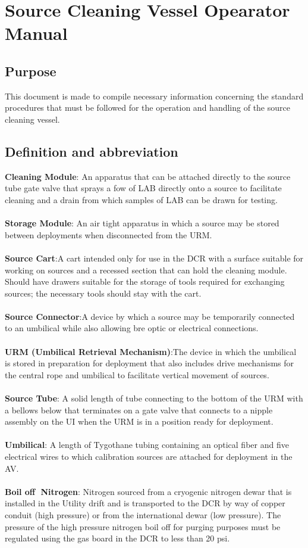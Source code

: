 \chapter{Source Cleaning Vessel Opearator Manual}
\section{Purpose}
This document is made to compile necessary information concerning the standard procedures that must be followed for the operation and handling of  the source cleaning vessel.
\section{Definition and abbreviation}
\textbf{Cleaning Module}: An apparatus that can be attached directly to the source tube gate valve that sprays a fow of LAB directly onto a source to facilitate cleaning and a drain from which samples of LAB can be drawn for testing.\\
\\
\textbf{Storage Module}: An air tight apparatus in which a source may be stored between deployments when disconnected from the URM.\\
\\
\textbf{Source Cart}:A cart intended only for use in the DCR with a surface suitable for working on sources and a recessed section that can hold the cleaning module. Should have drawers suitable for the storage of tools required for exchanging sources; the necessary tools should stay with the cart.\\
\\
\textbf{Source Connector}:A device by which a source may be temporarily connected to an umbilical while also allowing bre optic or electrical connections.\\
\\
\textbf{URM (Umbilical Retrieval Mechanism)}:The device in which the umbilical is stored
in preparation for deployment that also includes drive mechanisms for the central rope and umbilical to facilitate vertical movement of sources.\\
\\
\textbf{Source Tube}: A solid length of tube connecting to the bottom of the URM with a bellows below that terminates on a gate valve that connects to a nipple assembly on the UI when the URM is in a position ready for deployment.\\
\\
\textbf{Umbilical}: A length of Tygothane tubing containing an optical fiber and five electrical wires to which calibration sources are attached for deployment in the AV.\\
\\
\textbf{Boil off Nitrogen}: Nitrogen sourced from a cryogenic nitrogen dewar that is installed in the Utility drift and is transported to the DCR by way of copper conduit (high pressure) or from the international dewar (low pressure). The pressure of the high pressure nitrogen boil off  for purging purposes must be regulated using the gas board in the DCR to less than 20 psi.








